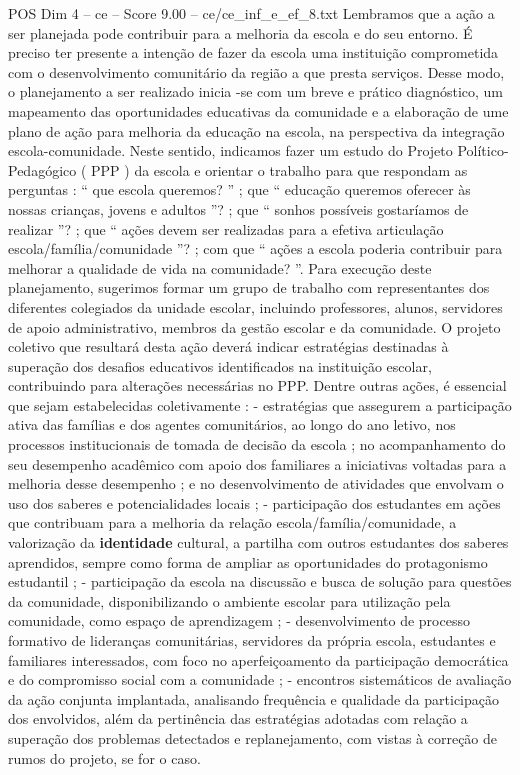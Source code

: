 \begin{textsample}{POS Dim 4 – ce – Score 9.00 – ce/ce\_inf\_e\_ef\_8.txt}
Lembramos que a ação a ser planejada pode contribuir para a melhoria da escola e do seu entorno.
É preciso ter presente a intenção de fazer da escola uma instituição comprometida com o desenvolvimento comunitário da região a que presta serviços.
Desse modo, o planejamento a ser realizado inicia -se com um breve e prático diagnóstico, um mapeamento das oportunidades educativas da comunidade e a elaboração de ume plano de ação para melhoria da educação na escola, na perspectiva da integração escola-comunidade.
Neste sentido, indicamos fazer um estudo do Projeto Político-Pedagógico ( PPP ) da escola e orientar o trabalho para que respondam as perguntas : “ que escola queremos? ” ; que “ educação queremos oferecer às nossas crianças, jovens e adultos ”? ; que “ sonhos possíveis gostaríamos de realizar ”? ; que “ ações devem ser realizadas para a efetiva articulação escola/família/comunidade ”? ; com que “ ações a escola poderia contribuir para melhorar a qualidade de vida na comunidade? ”.
Para execução deste planejamento, sugerimos formar um grupo de trabalho com representantes dos diferentes colegiados da unidade escolar, incluindo professores, alunos, servidores de apoio administrativo, membros da gestão escolar e da comunidade.
O projeto coletivo que resultará desta ação deverá indicar estratégias destinadas à superação dos desafios educativos identificados na instituição escolar, contribuindo para alterações necessárias no PPP.
Dentre outras ações, é essencial que sejam estabelecidas coletivamente : - estratégias que assegurem a participação ativa das famílias e dos agentes comunitários, ao longo do ano letivo, nos processos institucionais de tomada de decisão da escola ; no acompanhamento do seu desempenho acadêmico com apoio dos familiares a iniciativas voltadas para a melhoria desse desempenho ; e no desenvolvimento de atividades que envolvam o uso dos saberes e potencialidades locais ; - participação dos estudantes em ações que contribuam para a melhoria da relação escola/família/comunidade, a valorização da \textbf{identidade} cultural, a partilha com outros estudantes dos saberes aprendidos, sempre como forma de ampliar as oportunidades do protagonismo estudantil ; - participação da escola na discussão e busca de solução para questões da comunidade, disponibilizando o ambiente escolar para utilização pela comunidade, como espaço de aprendizagem ; - desenvolvimento de processo formativo de lideranças comunitárias, servidores da própria escola, estudantes e familiares interessados, com foco no aperfeiçoamento da participação democrática e do compromisso social com a comunidade ; - encontros sistemáticos de avaliação da ação conjunta implantada, analisando frequência e qualidade da participação dos envolvidos, além da pertinência das estratégias adotadas com relação a superação dos problemas detectados e replanejamento, com vistas à correção de rumos do projeto, se for o caso.

\end{textsample}
